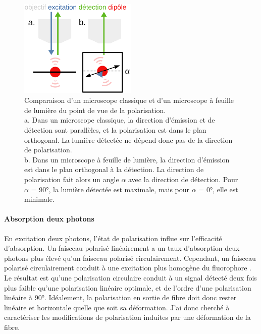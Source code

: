 \begin{figure}
\centering
\includegraphics[width=0.5\textwidth]{./files/polarization_plane.svg.png}
\caption{Comparaison d'un microscope classique et d'un microscope à feuille de lumière du point de vue de la polarisation.
\\ a. Dans un microscope classique, la direction d'émission et de détection sont parallèles, et la polarisation est dans le plan orthogonal. La lumière détectée ne dépend donc pas de la direction de polarisation.
\\ b. Dans un microscope à feuille de lumière, la direction d'émission est dans le plan orthogonal à la détection. La direction de polarisation fait alors un angle $\alpha$ avec la direction de détection. Pour $\alpha$ = 90°, la lumière détectée est maximale, mais pour $\alpha$ = 0°, elle est minimale.
\label{FIGpolarisation}}
\end{figure}


\paragraph{Absorption deux photons}

En excitation deux photons, l'état de polarisation influe sur l'efficacité d'absorption. Un faisceau polarisé linéairement a un taux d'absorption deux photons plus élevé qu'un faisceau polarisé circulairement. Cependant, un faisceau polarisé circulairement conduit à une excitation plus homogène du fluorophore \cite{de_vito_effects_2020}. Le résultat est qu'une polarisation circulaire conduit à un signal détecté deux fois plus faible qu'une polarisation linéaire optimale, et de l'ordre d'une polarisation linéaire à 90°. Idéalement, la polarisation en sortie de fibre doit donc rester linéaire et horizontale quelle que soit sa déformation. J'ai donc cherché à caractériser les modifications de polarisation induites par une déformation de la fibre.

